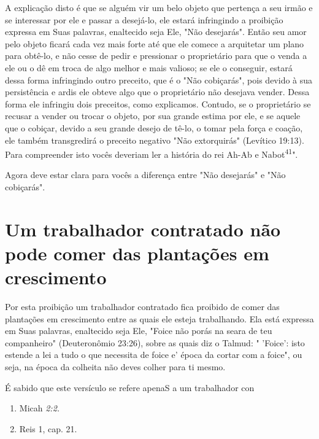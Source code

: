 \begin{itemize}
\begin{enumrate}
\begin{itemize}
\begin{itemize}
\begin{itemize}
A explicação disto é que se alguém vir um belo objeto que pertença a seu
irmão e se interessar por ele e passar a desejá-lo, ele estará
infringindo a proibição expressa em Suas palavras, enaltecido seja Ele,
"Não desejarás". Então seu amor pelo objeto ficará cada vez mais forte
até que ele comece a arquitetar um plano para obtê-lo, e não cesse de
pedir e pressionar o proprietário para que o venda a ele ou o dê em
troca de algo melhor e mais valioso; se ele o conseguir, estará dessa
forma infringindo outro preceito, que é o "Não cobiça­rás", pois devido
à sua persistência e ardis ele obteve algo que o proprietário não
desejava vender. Dessa forma ele infringiu dois preceitos, como
explica­mos. Contudo, se o proprietário se recusar a vender ou trocar o
objeto, por sua grande estima por ele, e se aquele que o cobiçar, devido
a seu grande dese­jo de tê-lo, o tomar pela força e coação, ele também
transgredirá o preceito negativo "Não extorquirás" (Levítico 19:13).
Para compreender isto vocês de­veriam ler a história do rei Ah-Ab e
Nabot\textsuperscript{41}".

Agora deve estar clara para vocês a diferença entre "Não desejarás" e
"Não cobiçarás".

\section{Um trabalhador contratado não pode comer das plantações em crescimento}

Por esta proibição um trabalhador contratado fica proibido de co­mer das
plantações em crescimento entre as quais ele esteja trabalhando. Ela
está expressa em Suas palavras, enaltecido seja Ele, "Foice não porás na
seara de teu companheiro" (Deuteronômio 23:26), sobre as quais diz o
Talmud: " 'Foi­ce': isto estende a lei a tudo o que necessita de foice
e' época da cortar com a foice", ou seja, na época da colheita não deves
colher para ti mesmo.


É sabido que este versículo se refere apenaS a um trabalhador con

\begin{enumerate}
\def\labelenumi{\arabic{enumi}.}
\setcounter{enumi}{408}
\item
 
 Micah \emph{2:2.}
 
\item
 
 Reis 1, cap. 21.
 
\end{enumerate}




\end{itemize}
\end{itemize}
\end{itemize}
\end{enumrate}
\end{itemize}

